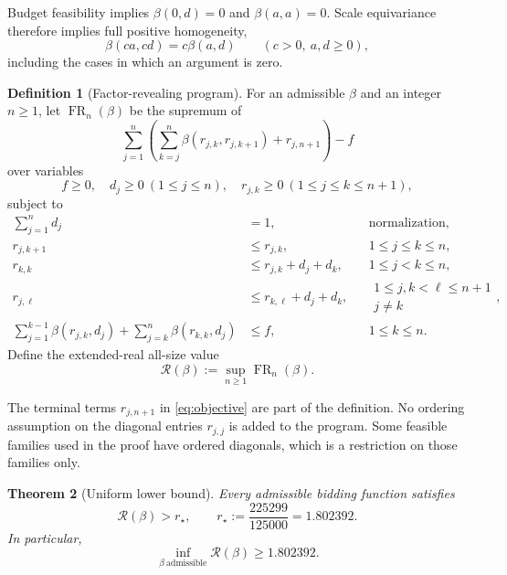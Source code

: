 \documentclass[11pt]{article}
\numberwithin{equation}{section}
\newtheorem{theorem}{Theorem}[section]
\theoremstyle{definition}
\newtheorem{definition}[theorem]{Definition}
\newcommand{\FR}{\operatorname{FR}}
\newcommand{\calR}{\mathcal R}
\newcommand{\rstar}{r_\star}
\begin{document}
Budget feasibility implies $\beta(0,d)=0$ and $\beta(a,a)=0$. Scale equivariance
therefore implies full positive homogeneity,
\begin{equation}\label{eq:homogeneity}
 \beta(ca,cd)=c\beta(a,d)\qquad(c>0,\ a,d\ge0),
\end{equation}
including the cases in which an argument is zero.

\begin{definition}[Factor-revealing program]\label{def:frp}
For an admissible $\beta$ and an integer $n\ge1$, let $\FR_n(\beta)$ be the
supremum of
\begin{equation}\label{eq:objective}
 \sum_{j=1}^{n}\left(\sum_{k=j}^{n}
       \beta(r_{j,k},r_{j,k+1})+r_{j,n+1}\right)-f
\end{equation}
over variables
\[
 f\ge0,\quad d_j\ge0\ (1\le j\le n),\quad
 r_{j,k}\ge0\ (1\le j\le k\le n+1),
\]
subject to
\begin{align}
 \sum_{j=1}^{n}d_j&=1,
 &&\text{normalization},\label{eq:normalization}\\
 r_{j,k+1}&\le r_{j,k},
 &&1\le j\le k\le n,\label{eq:rowmono}\\
 r_{k,k}&\le r_{j,k}+d_j+d_k,
 &&1\le j<k\le n,\label{eq:triangle}\\
 r_{j,\ell}&\le r_{k,\ell}+d_j+d_k,
 &&\substack{1\le j,k<\ell\le n+1\\j\ne k},\label{eq:metric}\\
 \sum_{j=1}^{k-1}\beta(r_{j,k},d_j)
 +\sum_{j=k}^{n}\beta(r_{k,k},d_j)&\le f,
 &&1\le k\le n.\label{eq:facility}
\end{align}
Define the extended-real all-size value
\begin{equation}\label{eq:allsize}
 \calR(\beta):=\sup_{n\ge1}\FR_n(\beta).
\end{equation}
\end{definition}

The terminal terms $r_{j,n+1}$ in \eqref{eq:objective} are part of the
definition. No ordering assumption on the diagonal entries $r_{j,j}$ is added
to the program. Some feasible families used in the proof have ordered
diagonals, which is a restriction on those families only.

\begin{theorem}[Uniform lower bound]\label{thm:main}
Every admissible bidding function satisfies
\begin{equation}\label{eq:main}
 \calR(\beta)>\rstar,
 \qquad \rstar:=\frac{225299}{125000}=1.802392.
\end{equation}
In particular,
\[
 \inf_{\beta\ \mathrm{admissible}}\calR(\beta)\ge1.802392.
\]
\end{theorem}
\end{document}
